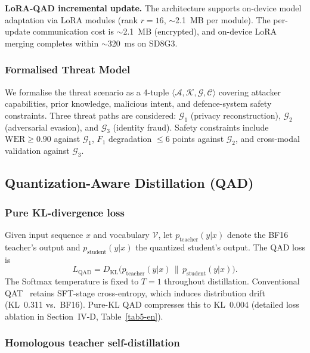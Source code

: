\documentclass[final,5p,times,number]{elsarticle}
\begin{document}
\medskip
\noindent\textbf{LoRA-QAD incremental update.} The architecture supports on-device model adaptation via LoRA modules (rank $r=16$, $\sim$2.1~MB per module). The per-update communication cost is $\sim$2.1~MB (encrypted), and on-device LoRA merging completes within $\sim$320~ms on SD8G3.

\subsubsection{Formalised Threat Model}

We formalise the threat scenario as a 4-tuple $\langle \mathcal{A}, \mathcal{K}, \mathcal{G}, \mathcal{C} \rangle$ covering attacker capabilities, prior knowledge, malicious intent, and defence-system safety constraints. Three threat paths are considered: $\mathcal{G}_1$ (privacy reconstruction), $\mathcal{G}_2$ (adversarial evasion), and $\mathcal{G}_3$ (identity fraud). Safety constraints include $\text{WER}\ge 0.90$ against $\mathcal{G}_1$, $F_1$ degradation $\le 6$ points against $\mathcal{G}_2$, and cross-modal validation against $\mathcal{G}_3$.

\subsection{Quantization-Aware Distillation (QAD)}
\subsubsection{Pure KL-divergence loss}

Given input sequence $x$ and vocabulary $\mathcal{V}$, let $p_{\text{teacher}}(y|x)$ denote the BF16 teacher's output and $p_{\text{student}}(y|x)$ the quantized student's output. The QAD loss is
\begin{equation}
\label{eq:kl-loss}
L_{\mathrm{QAD}} = D_{\mathrm{KL}}\!\bigl( p_{\text{teacher}}(y|x)\,\|\,p_{\text{student}}(y|x) \bigr).
\end{equation}
The Softmax temperature is fixed to $T = 1$ throughout distillation. Conventional QAT~\cite{24,25,26} retains SFT-stage cross-entropy, which induces distribution drift (KL~0.311 vs.\ BF16). Pure-KL QAD compresses this to KL~0.004 (detailed loss ablation in Section~IV-D, Table~\ref{tab5-en}).

\subsubsection{Homologous teacher self-distillation}
\end{document}
